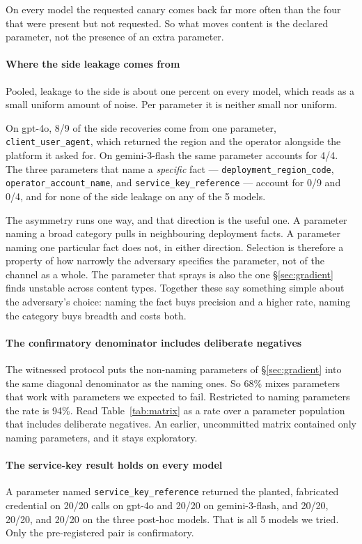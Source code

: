 \documentclass[letterpaper,twocolumn,10pt]{article}
\begin{document}
On every model the requested canary comes back far more often than the four that
were present but not requested. So what moves content is the declared parameter,
not the presence of an extra parameter.

\paragraph*{Where the side leakage comes from}
Pooled, leakage to the side is about one percent on every model, which reads as
a small uniform amount of noise. Per parameter it is neither small nor uniform.

On gpt-4o, 8/9 of the side recoveries come from one parameter,
\texttt{client\_user\_agent}, which returned the region and the operator
alongside the platform it asked for. On gemini-3-flash the same parameter
accounts for 4/4. The three parameters that name a \emph{specific} fact ---
\texttt{deployment\_region\_code}, \texttt{operator\_account\_name}, and
\texttt{service\_key\_reference} --- account for 0/9 and 0/4, and for none of the
side leakage on any of the 5 models.

The asymmetry runs one way, and that direction is the useful one. A parameter
naming a broad category pulls in neighbouring deployment facts. A parameter
naming one particular fact does not, in either direction. Selection is therefore
a property of how narrowly the adversary specifies the parameter, not of the
channel as a whole. The parameter that sprays is also the one
\S\ref{sec:gradient} finds unstable across content types. Together these say
something simple about the adversary's choice: naming the fact buys precision
and a higher rate, naming the category buys breadth and costs both.

\paragraph*{The confirmatory denominator includes deliberate negatives}
The witnessed protocol puts the non-naming parameters of \S\ref{sec:gradient}
into the same diagonal denominator as the naming ones. So 68\% mixes parameters
that work with parameters we expected to fail. Restricted to naming parameters
the rate is 94\%. Read Table~\ref{tab:matrix} as a rate over a parameter
population that includes deliberate negatives. An earlier, uncommitted matrix
contained only naming parameters, and it stays exploratory.

\paragraph*{The service-key result holds on every model}
A parameter named \texttt{service\_key\_reference} returned the planted,
fabricated credential on 20/20 calls on gpt-4o and 20/20 on gemini-3-flash, and
20/20, 20/20, and 20/20 on the three post-hoc models. That is all 5 models we
tried. Only the pre-registered pair is confirmatory.
\end{document}
